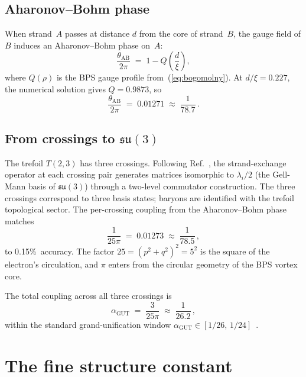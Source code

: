 \documentclass[11pt]{article}
\begin{document}
\subsection{Aharonov--Bohm phase}

When strand~$A$ passes at distance $d$ from the core of strand~$B$,
the gauge field of $B$ induces an Aharonov--Bohm phase on~$A$:
\begin{equation}
\label{eq:ab_phase}
\frac{\theta_\text{AB}}{2\pi} \;=\; 1 - Q\!\left(\frac{d}{\xi}\right),
\end{equation}
where $Q(\rho)$ is the BPS gauge profile from~(\ref{eq:bogomolny}).
At $d/\xi = 0.227$, the numerical solution gives
$Q = 0.9873$, so
\begin{equation}
\frac{\theta_\text{AB}}{2\pi} \;=\; 0.01271 \;\approx\; \frac{1}{78.7}\,.
\end{equation}

\subsection{From crossings to $\mathfrak{su}(3)$}

The trefoil $T(2,3)$ has three crossings.  Following
Ref.~\cite{NWT8}, the strand-exchange operator at each crossing pair
generates matrices isomorphic to $\lambda_i/2$ (the Gell-Mann basis
of $\mathfrak{su}(3)$) through a two-level commutator construction.
The three crossings correspond to three basis states; baryons are
identified with the trefoil topological sector.  The per-crossing coupling from the
Aharonov--Bohm phase matches
\begin{equation}
\frac{1}{25\pi} \;=\; 0.01273 \;\approx\; \frac{1}{78.5}\,,
\end{equation}
to 0.15\%~accuracy.  The factor $25 = (p^2+q^2)^2 = 5^2$ is the
square of the electron's circulation, and $\pi$ enters from the
circular geometry of the BPS vortex core.

The total coupling across all three crossings is
\begin{equation}
\alpha_\text{GUT} \;=\; \frac{3}{25\pi}
    \;\approx\; \frac{1}{26.2}\,,
\end{equation}
within the standard grand-unification window $\alpha_\text{GUT} \in
[1/26,\, 1/24]$~\cite{Langacker1981,Marciano1981}.


\section{The fine structure constant}
\label{sec:alpha}
\end{document}
